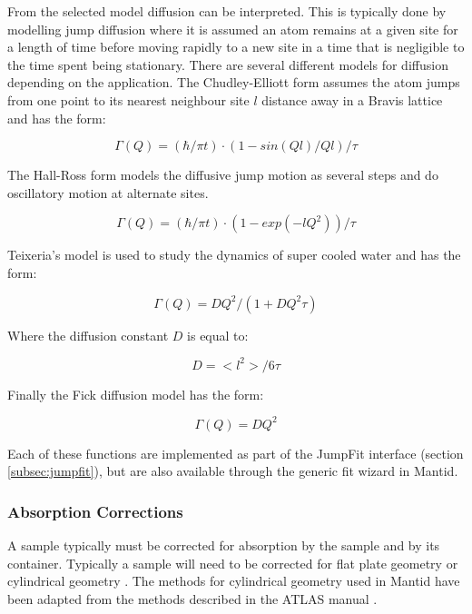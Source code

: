 \documentclass[paper=a4, fontsize=11pt]{scrartcl}	%
\numberwithin{equation}{section}															%
\numberwithin{figure}{section}																%
\numberwithin{table}{section}																%
\begin{document}
From the selected model diffusion can be interpreted. This is typically done by modelling jump diffusion where it is assumed an atom remains at a given site for a length of time before moving rapidly to a new site in a time that is negligible to the time spent being stationary. There are several different models for diffusion depending on the application. The Chudley-Elliott form assumes the atom jumps from one point to its nearest neighbour site $l$ distance away in a Bravis lattice \cite{chudley1961neutron} and has the form:

\begin{equation}
\Gamma(Q) = (\hbar/\pi t) \cdot (1 - sin(Ql)/Ql)/\tau
\end{equation}

The Hall-Ross \cite{hall1981incoherent} form models the diffusive jump motion as several steps and do oscillatory motion at alternate sites.

\begin{equation}
\Gamma(Q) = (\hbar/\pi t) \cdot (1-exp(-lQ^2))/\tau
\end{equation}

Teixeria's model \cite{teixeira1985experimental} is used to study the dynamics of super cooled water and has the form:

\begin{equation}
\Gamma(Q) = DQ^2/(1 + DQ^2\tau)
\end{equation}

Where the diffusion constant $D$ is equal to:

\begin{equation}
D=<l^2>/6\tau
\end{equation}

Finally the Fick diffusion model \cite{fick1855v} has the form:

\begin{equation}
\Gamma(Q) = DQ^2
\end{equation}

Each of these functions are implemented as part of the JumpFit interface (section \ref{subsec:jumpfit}), but are also available through the generic fit wizard in Mantid.

\subsubsection{Absorption Corrections}
A sample typically must be corrected for absorption by the sample and by its container. Typically a sample will need to be corrected for flat plate geometry \cite{ccarlile1974} or cylindrical geometry \cite{aksoper1989}. The methods for cylindrical geometry used in Mantid have been adapted from the methods described in the ATLAS manual \cite{aksoper1989}.
\end{document}
